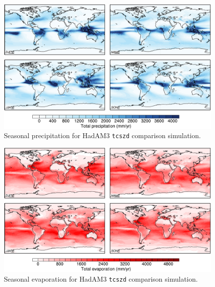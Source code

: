 \documentclass[a4paper,11pt]{article}
\begin{document}
\begin{figure}
  \begin{center}
    \includegraphics[width=\textwidth]{../hadam3-comparison/plots/pp-plots}
  \end{center}
  \caption{Seasonal precipitation for HadAM3 \texttt{tcszd} comparison
    simulation.}
  \label{fig:pp-hadam3}
\end{figure}

\begin{figure}
  \begin{center}
    \includegraphics[width=\textwidth]{../hadam3-comparison/plots/evap-plots}
  \end{center}
  \caption{Seasonal evaporation for HadAM3 \texttt{tcszd} comparison
    simulation.}
  \label{fig:evap-hadam3}
\end{figure}
\end{document}
